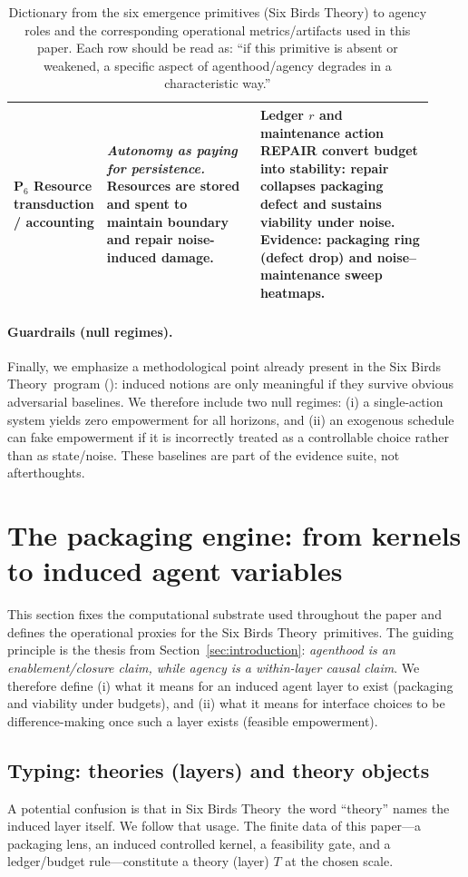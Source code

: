 \documentclass[11pt]{article}
\newcommand{\SBT}{Six Birds Theory}
\begin{document}
\begin{table}[t]
\begin{tabular}{@{}p{0.13\linewidth} p{0.37\linewidth} p{0.42\linewidth}@{}}
P$_6$ Resource transduction / accounting &
\emph{Autonomy as paying for persistence.} Resources are stored and spent to maintain boundary and repair noise-induced damage. &
Ledger $r$ and maintenance action REPAIR convert budget into stability: repair collapses packaging defect and sustains viability under noise. Evidence: packaging ring (defect drop) and noise--maintenance sweep heatmaps. \\
\bottomrule
\end{tabular}
\caption{Dictionary from the six emergence primitives (\SBT) to agency roles and the corresponding operational metrics/artifacts used in this paper. Each row should be read as: ``if this primitive is absent or weakened, a specific aspect of agenthood/agency degrades in a characteristic way.''}
\label{tab:dictionary}
\end{table}

\paragraph{Guardrails (null regimes).}
Finally, we emphasize a methodological point already present in the \SBT\ program (\citep{six_birds_life}): induced notions are only meaningful if they survive obvious adversarial baselines. We therefore include two null regimes: (i) a single-action system yields zero empowerment for all horizons, and (ii) an exogenous schedule can fake empowerment if it is incorrectly treated as a controllable choice rather than as state/noise. These baselines are part of the evidence suite, not afterthoughts.
 \section{The packaging engine: from kernels to induced agent variables}
\label{sec:engine}

This section fixes the computational substrate used throughout the paper and defines the operational proxies for the \SBT\ primitives. The guiding principle is the thesis from Section~\ref{sec:introduction}: \emph{agenthood is an enablement/closure claim, while agency is a within-layer causal claim}. We therefore define (i) what it means for an induced agent layer to exist (packaging and viability under budgets), and (ii) what it means for interface choices to be difference-making once such a layer exists (feasible empowerment).

\subsection{Typing: theories (layers) and theory objects}
A potential confusion is that in \SBT\ the word ``theory'' names the induced layer itself. We follow that usage. The finite data of this paper---a packaging lens, an induced controlled kernel, a feasibility gate, and a ledger/budget rule---constitute a theory (layer) $T$ at the chosen scale.
\end{document}
